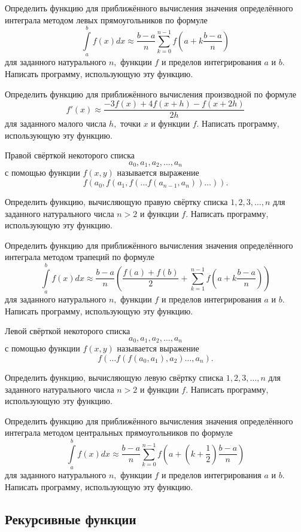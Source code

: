 \task Определить функцию для приближённого вычисления значения
определённого интеграла методом левых
прямоугольников по формуле
\[
\int\limits_a^b f(x) dx \approx
\frac{b-a}{n}\sum_{k=0}^{n-1} f \left(a + k\frac{b-a}{n}\right)
\]
для заданного натурального $n,$ функции $f$ и пределов интегрирования
$a$ и $b.$ Написать программу, использующую эту функцию.

\task Определить функцию для приближённого вычисления производной по
формуле
\[
f'(x) \approx \frac{-3f(x) + 4f(x+h) - f(x+2h)}{2h}
\]
для заданного малого числа $h,$ точки $x$ и функции $f.$ Написать
программу, использующую эту функцию.

\task Правой свёрткой некоторого списка
\[
a_0, a_1, a_2, \ldots, a_n
\]
с помощью функции $f(x, y)$ называется выражение
\[
f(a_0, f(a_1, f(\ldots f(a_{n-1}, a_n)) \ldots)). 
\]

Определить функцию, вычисляющую правую свёртку списка $1, 2, 3,
\ldots, n$ для заданного натурального числа $n > 2$ и функции
$f$. Написать программу, использующую эту функцию.

\task Определить функцию для приближённого вычисления значения
определённого интеграла методом трапеций по
формуле
\[
\int\limits_a^b f(x) dx \approx
\frac{b-a}{n}\left(
\frac{f(a)+f(b)}2 + \sum_{k=1}^{n-1} f \left(a + k\frac{b-a}{n}\right)
\right)
\]
для заданного натурального $n,$ функции $f$ и пределов интегрирования
$a$ и $b.$ Написать программу, использующую эту функцию.

\task Левой свёрткой некоторого списка
\[
a_0, a_1, a_2, \ldots, a_n
\]
с помощью функции $f(x, y)$ называется выражение
\[
f(\ldots f(f(a_0, a_1), a_2) \ldots, a_n). 
\]

Определить функцию, вычисляющую левую свёртку списка $1, 2, 3, \ldots,
n$ для заданного натурального числа $n > 2$ и функции $f.$ Написать
программу, использующую эту функцию.

\task Определить функцию для приближённого вычисления значения
определённого интеграла методом центральных
прямоугольников по формуле
\[
\int\limits_a^b f(x) dx \approx
\frac{b-a}{n}\sum_{k=0}^{n-1} f \left(
a + \left(k+\frac{1}{2}\right)\frac{b-a}{n}
\right)
\]
для заданного натурального $n,$ функции $f$ и пределов интегрирования
$a$ и $b.$ Написать программу, использующую эту функцию.


\subsection{Рекурсивные функции}

